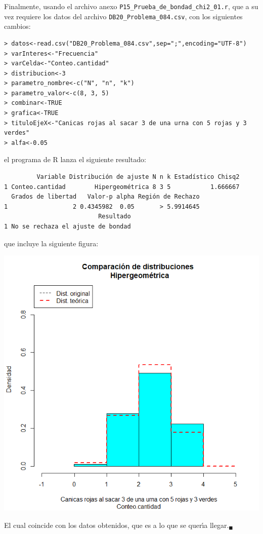 \begin{solucion}
 Finalmente, usando el archivo anexo
 \texttt{P15\_Prueba\_de\_bondad\_chi2\_01.r},
 que a su vez requiere los datos del archivo
 \texttt{DB20\_Problema\_084.csv}, con los siguientes cambios:
 \begin{verbatim}
> datos<-read.csv("DB20_Problema_084.csv",sep=";",encoding="UTF-8")
> varInteres<-"Frecuencia"
> varCelda<-"Conteo.cantidad"
> distribucion<-3
> parametro_nombre<-c("N", "n", "k")
> parametro_valor<-c(8, 3, 5)
> combinar<-TRUE
> grafica<-TRUE
> tituloEjeX<-"Canicas rojas al sacar 3 de una urna con 5 rojas y 3 verdes"
> alfa<-0.05
 \end{verbatim}
 \vspace{-0.5cm}
 el programa de R lanza el siguiente resultado:
 \begin{verbatim}
         Variable Distribución de ajuste N n k Estadístico Chisq2
1 Conteo.cantidad        Hipergeométrica 8 3 5           1.666667
  Grados de libertad   Valor-p alpha Región de Rechazo
1                  2 0.4345982  0.05       > 5.9914645
                          Resultado
1 No se rechaza el ajuste de bondad
 \end{verbatim}
 \vspace{-0.5cm}
 que incluye la siguiente figura:
 \begin{center}
  \includegraphics[scale=0.35]{Problema_84.png}
 \end{center}
 El cual coincide con los datos obtenidos,
 que es a lo que se quer\'{\i}a llegar.${}_{\blacksquare}$
\end{solucion}
